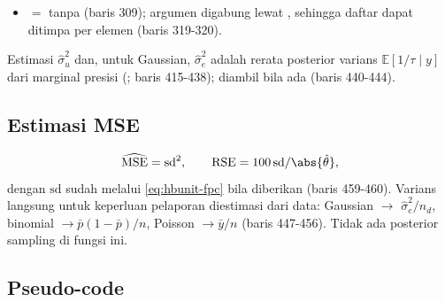 \begin{itemize}
        Untuk binomial/Poisson rerata domain diprediksi pada rata-rata
        kovariat, $g^{-1}(\bar x_{d,r}^\top\beta+u_d)$, yang bias untuk link
        nonlinier (Jensen): pada simulasi $-8\%$ (binomial) dan $-16\%$
        (Poisson), coverage $90\%$ dan $78\%$. Fungsi memberi warning;
        estimasi tak bias butuh kovariat unit populasi (EBP, Molina \& Rao 2010).
        Ringkasan $\sigma_u^2$ () tetap tidak
        andal: posterior eksak sangat miring (rerata $40{,}9$, median $7{,}0$),
        INLA melaporkan $\approx70$.
  \item {} $=$  tanpa
         (baris 309); argumen  digabung
        lewat , sehingga daftar  dapat
        ditimpa per elemen (baris 319-320).
\end{itemize}
Estimasi $\hat\sigma_u^2$ dan, untuk Gaussian, $\hat\sigma_e^2$ adalah rerata
posterior varians $\mathbb E[1/\tau\mid y]$ dari marginal presisi
(; baris 415-438);  diambil bila ada
(baris 440-444).

\subsection{Estimasi MSE}\label{sec:hbunit-mse}

\begin{equation}
  \widehat{\mathrm{MSE}}=\mathrm{sd}^2,
  \qquad
  \mathrm{RSE}=100\,\mathrm{sd}/\abs{\hat\theta},
  \label{eq:hbunit-mse}
\end{equation}
dengan $\mathrm{sd}$ sudah melalui \eqref{eq:hbunit-fpc} bila
 diberikan (baris 459-460). Varians langsung untuk
keperluan pelaporan diestimasi dari data: Gaussian $\to$
$\hat\sigma_e^2/n_d$, binomial $\to\bar p(1-\bar p)/n$, Poisson
$\to\bar y/n$ (baris 447-456). Tidak ada posterior sampling di fungsi ini.

\subsection{Pseudo-code}\label{sec:hbunit-algo}

